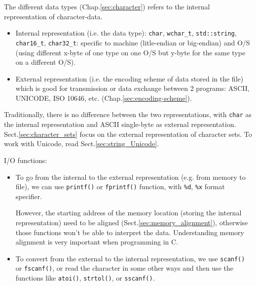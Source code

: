 The different data types (Chap.\ref{sec:character}) refers to the internal
representation of character-data.
\begin{itemize}
  \item Internal representation (i.e. the data type): \verb!char!,
  \verb!wchar_t!, \verb!std::string!, \verb!char16_t!, \verb!char32_t!:
  specific to machine (litle-endian or big-endian) and O/S (using different
  x-byte of one type on one O/S but y-byte for the same type on a different
  O/S).
  
  \item External representation (i.e. the encoding scheme of data stored in the
  file) which is good for transmission or data exchange between 2 programs:
  ASCII, UNICODE, ISO 10646, etc. (Chap.\ref{sec:encoding-scheme}).
  
\end{itemize}
Traditionally, there is no difference between the two representations,
with \verb!char! as the internal representation and ASCII single-byte
as external representation. Sect.\ref{sec:character_sets} focus on the external
representation of character sets. To work with Unicode, read
Sect.\ref{sec:string_Unicode}. 


I/O functions:
\begin{itemize}
  
  \item  To go from the internal to the external representation (e.g. from
  memory to file), we can use \verb!printf()! or \verb!fprintf()! function, with
  \verb!%d!, \verb!%x! format specifier.

However, the starting address of the memory location (storing the internal
representation) need to be aligned (Sect.\ref{sec:memory_alignment}), otherwise
those functions won't be able to interpret the data. Understanding memory
alignment is very important when programming in C.

  \item To convert from the external to the internal representation,
we use \verb!scanf()! or \verb!fscanf()!, or read the character in some other
ways and then use the functions like \verb!atoi()!, \verb!strtol()!, or
\verb!sscanf()!.
\end{itemize}


